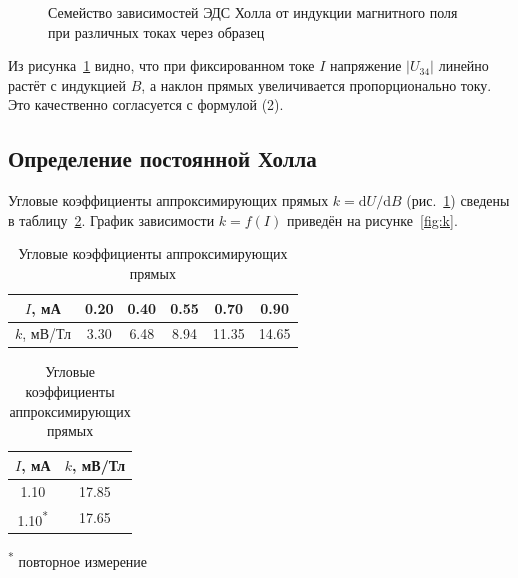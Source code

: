 \documentclass[a4paper,12pt]{article}
\begin{document}
\begin{figure}[H]
    \caption{Семейство зависимостей ЭДС Холла от индукции магнитного поля при различных токах через образец}
    \label{fig:hall}
\end{figure}

Из рисунка~\ref{fig:hall} видно, что при фиксированном токе $I$ напряжение $|U_{34}|$ линейно растёт с индукцией $B$, а наклон прямых увеличивается пропорционально току. Это качественно согласуется с формулой (2).

\subsection{Определение постоянной Холла}
Угловые коэффициенты аппроксимирующих прямых $k = \mathrm{d}U/\mathrm{d}B$ (рис.~\ref{fig:hall}) сведены в таблицу~\ref{tab:k}. График зависимости $k = f(I)$ приведён на рисунке~\ref{fig:k}.

\begin{table}[H]
    \centering
    \caption{Угловые коэффициенты аппроксимирующих прямых}
    \label{tab:k}
    \begin{tabular}{c ccccc}
        \toprule
        $I$, мА   & 0.20 & 0.40 & 0.55 & 0.70 & 0.90 \\
        \midrule
        $k$, мВ/Тл & 3.30 & 6.48 & 8.94 & 11.35 & 14.65 \\
        \bottomrule
    \end{tabular}
    \qquad
    \begin{tabular}{c c}
        \toprule
        $I$, мА & $k$, мВ/Тл \\
        \midrule
        1.10 & 17.85 \\
        1.10\textsuperscript{*} & 17.65 \\
        \bottomrule
    \end{tabular}
    \par\vspace{2pt}
    {\footnotesize\textsuperscript{*} повторное измерение}
\end{table}
\end{document}

